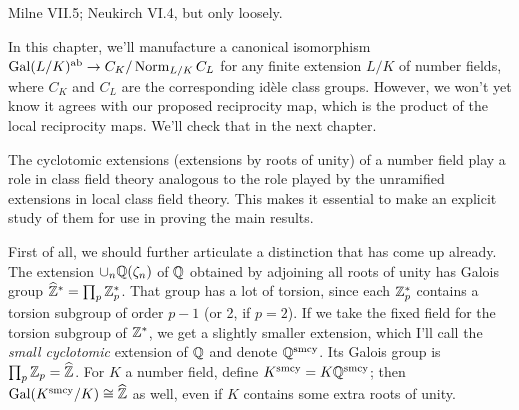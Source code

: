 %
%
%
%
%
%
%

Milne VII.5; Neukirch VI.4, but only loosely.

\medskip

In this chapter, we'll manufacture a canonical isomorphism
$\operatorname{Gal}(L/K)^{\operatorname{ab}} \to C_K/\operatorname{Norm}_{L/K} C_L$ for any finite extension
$L/K$ of number fields, where $C_K$ and $C_L$ are the corresponding
id\`ele class groups. However, we won't yet know it agrees with our proposed
reciprocity map, which is the product of the local reciprocity maps.
We'll check that in the next chapter.


The cyclotomic extensions (extensions by roots of unity)
of a number field play a role in class field
theory analogous to the role played by the unramified extensions in local
class field theory. This makes it essential to make an explicit study
of them for use in proving the main results.

First of all, we should further articulate a distinction that has come up already.
The extension $\cup_n \mathbb{Q}(\zeta_n)$ of $\mathbb{Q}$ obtained by adjoining all roots
of unity has Galois group $\widehat{\mathbb{Z}}^* =
\prod_p \mathbb{Z}_p^*$. That group has a lot
of torsion, since each $\mathbb{Z}_p^*$ contains a torsion subgroup of order $p-1$
(or 2, if $p=2$). If we take the fixed field for the torsion subgroup of
$\mathbb{Z}^*$, we get a slightly smaller extension, which I'll call the
\emph{small cyclotomic} extension of $\mathbb{Q}$ and denote $\mathbb{Q}^{\operatorname{smcy}}$.
Its Galois group is
$\prod_p \mathbb{Z}_p = \widehat{\mathbb{Z}}$. For $K$ a number field, define
$K^{\operatorname{smcy}} = K \mathbb{Q}^{\operatorname{smcy}}$; then $\operatorname{Gal}(K^{\operatorname{smcy}}/K) \cong \widehat{\mathbb{Z}}$
as well, even if $K$ contains some extra roots of unity.

